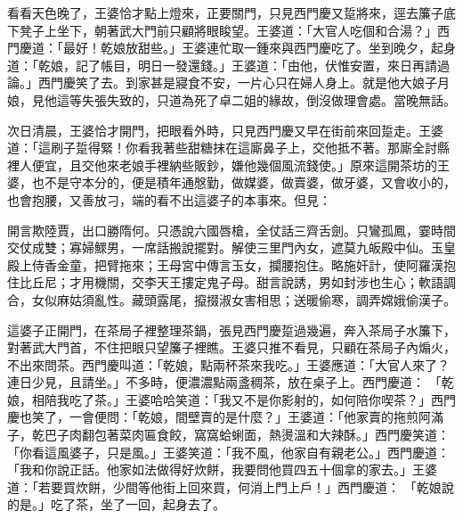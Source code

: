 看看天色晚了，王婆恰才點上燈來，正要關門，只見西門慶又踅將來，逕去簾子底下凳子上坐下，朝著武大門前只顧將眼睃望。王婆道：「大官人吃個和合湯？」西門慶道：「最好！乾娘放甜些。」王婆連忙取一鍾來與西門慶吃了。坐到晚夕，起身道：「乾娘，記了帳目，明日一發還錢。」王婆道：「由他，伏惟安置，來日再請過論。」西門慶笑了去。到家甚是寢食不安，一片心只在婦人身上。就是他大娘子月娘，見他這等失張失致的，只道為死了卓二姐的緣故，倒沒做理會處。當晚無話。

次日清晨，王婆恰才開門，把眼看外時，只見西門慶又早在街前來回踅走。王婆道：「這刷子踅得緊！你看我著些甜糖抹在這廝鼻子上，交他抵不著。那廝全討縣裡人便宜，且交他來老娘手裡納些販鈔，嫌他幾個風流錢使。」原來這開茶坊的王婆，也不是守本分的，便是積年通慇勤，做媒婆，做賣婆，做牙婆，又會收小的，也會抱腰，又善放刁，端的看不出這婆子的本事來。但見：

開言欺陸賈，出口勝隋何。只憑說六國唇槍，全仗話三齊舌劍。只鸞孤鳳，霎時間交仗成雙；寡婦鰥男，一席話搬說擺對。解使三里門內女，遮莫九皈殿中仙。玉皇殿上侍香金童，把臂拖來；王母宮中傳言玉女，攔腰抱住。略施奸計，使阿羅漢抱住比丘尼；才用機關，交李天王摟定鬼子母。甜言說誘，男如封涉也生心；軟語調合，女似麻姑須亂性。藏頭露尾，攛掇淑女害相思；送暖偷寒，調弄嫦娥偷漢子。

這婆子正開門，在茶局子裡整理茶鍋，張見西門慶踅過幾遍，奔入茶局子水簾下，對著武大門首，不住把眼只望簾子裡瞧。王婆只推不看見，只顧在茶局子內煽火，不出來問茶。西門慶叫道：「乾娘，點兩杯茶來我吃。」王婆應道：「大官人來了？連日少見，且請坐。」不多時，便濃濃點兩盞稠茶，放在桌子上。西門慶道： 「乾娘，相陪我吃了茶。」王婆哈哈笑道：「我又不是你影射的，如何陪你喫茶？」西門慶也笑了，一會便問：「乾娘，間壁賣的是什麼？」王婆道：「他家賣的拖煎阿滿子，乾巴子肉翻包著菜肉匾食餃，窩窩蛤蜊面，熱燙溫和大辣酥。」西門慶笑道：「你看這風婆子，只是風。」王婆笑道：「我不風，他家自有親老公。」西門慶道：「我和你說正話。他家如法做得好炊餅，我要問他買四五十個拿的家去。」王婆道：「若要買炊餅，少間等他街上回來買，何消上門上戶！」西門慶道： 「乾娘說的是。」吃了茶，坐了一回，起身去了。

